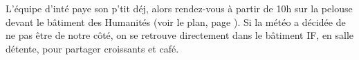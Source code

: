 L'équipe d'inté paye son p'tit déj, alors rendez-vous à
partir de 10h sur la pelouse devant le bâtiment des Humanités (voir le plan, page \pageref{plan}).
Si la météo a décidée de ne pas être de notre côté, on se retrouve directement dans le
bâtiment IF, en salle détente, pour partager croissants et café.

